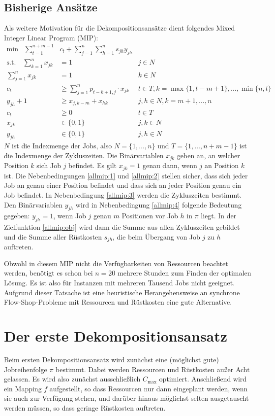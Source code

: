 \documentclass{scrreprt}
\begin{document}
\section{Bisherige Ansätze}
\label{sec:bisherigeAnsaetze}
Als weitere Motivation für die Dekompositionsansätze dient folgendes Mixed Integer Linear Program (MIP):
\begin{align}
    \text{min} \quad \sum_{t=1}^{n+m-1} &c_t + \sum_{j=1}^n \sum_{h=1}^n s_{jh} y_{jh} \label{allmip:obj}\\
    \text{s.t.}\quad \sum_{k=1}^n x_{jk} &= 1 & j\in N \label{allmip:1}\\
                     \sum_{j=1}^n x_{jk} &= 1 & k\in N \label{allmip:2}\\
    c_t &\geq \sum_{j=1}^n p_{t-k+1,j} \cdot x_{jk} & t\in T, k=\max\{1,t-m+1\},\ldots,\min\{n,t\} \label{allmip:3}\\
    y_{jh} + 1 &\geq x_{j,k-m} + x_{hk} & j,h\in N, k=m+1,\ldots,n \label{allmip:4}\\
    c_t &\geq 0 & t\in T \\
    x_{jk} &\in \{0,1\} & j,k\in N \\
    y_{jh} &\in \{0,1\} & j,h\in N
\end{align}
$N$ ist die Indexmenge der Jobs, also $N=\{1,\ldots,n\}$ und $T=\{1,\ldots,n+m-1\}$ ist die Indexmenge der Zykluszeiten.
Die Binärvariablen $x_{jk}$ geben an, an welcher Position $k$
sich Job $j$ befindet. Es gilt $x_{jk}=1$ genau dann, wenn $j$ an
Position $k$ ist. Die Nebenbedingungen \ref{allmip:1} und \ref{allmip:2}
stellen sicher, dass sich jeder Job an genau einer Position befindet und 
dass sich an jeder Position genau ein Job befindet.
In Nebenbedingung \ref{allmip:3} werden die Zykluszeiten bestimmt.
Den Binärvariablen $y_{jh}$ wird in Nebenbedingung \ref{allmip:4} folgende
Bedeutung gegeben: $y_{jh}=1$, wenn Job $j$ genau $m$ Positionen
vor Job $h$ in $\pi$ liegt.
In der Zielfunktion \ref{allmip:obj} wird dann die Summe aus allen
Zykluszeiten gebildet und die Summe aller Rüstkosten $s_{jh}$, die beim
Übergang von Job $j$ zu $h$ auftreten.

Obwohl in diesem MIP nicht die Verfügbarkeiten von Ressourcen beachtet werden,
benötigt es schon bei $n=20$ mehrere Stunden zum Finden der optimalen Lösung.
Es ist also für Instanzen mit mehreren Tausend Jobs nicht geeignet.
Aufgrund dieser Tatsache ist eine heuristische Herangehensweise an 
synchrone Flow-Shop-Probleme mit Ressourcen und Rüstkosten eine gute Alternative.


\chapter{Der erste Dekompositionsansatz}
Beim ersten Dekompositionsansatz wird zunächst eine (möglichst gute) Jobreihenfolge $\pi$ bestimmt.
Dabei werden Ressourcen und Rüstkosten außer Acht gelassen. 
Es wird also zunächst ausschließlich $C_{\max}$ optimiert. Anschließend wird ein Mapping $f$ aufgestellt,
so dass Ressourcen nur dann eingeplant werden, wenn sie auch zur Verfügung stehen, und darüber hinaus
möglichst selten ausgetauscht werden müssen, so dass geringe Rüstkosten auftreten.
\end{document}
